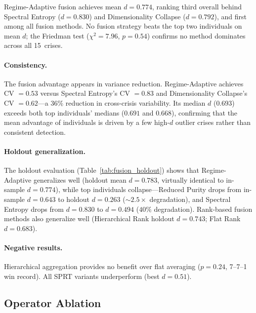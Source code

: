 \documentclass[3p]{elsarticle}
\begin{document}
Regime-Adaptive fusion achieves mean $d = 0.774$, ranking third
overall behind Spectral Entropy ($d = 0.830$) and Dimensionality
Collapse ($d = 0.792$), and first among all fusion methods.
No fusion strategy beats the top two individuals on mean $d$; the
Friedman test ($\chi^2 = 7.96$, $p = 0.54$) confirms no method
dominates across all 15~crises.

\paragraph{Consistency.}
The fusion advantage appears in variance reduction.
Regime-Adaptive achieves CV $= 0.53$ versus Spectral Entropy's
CV $= 0.83$ and Dimensionality Collapse's CV $= 0.62$---a 36\%
reduction in cross-crisis variability.  Its median $d$ ($0.693$)
exceeds both top individuals' medians ($0.691$ and $0.668$),
confirming that the mean advantage of individuals is driven by a
few high-$d$ outlier crises rather than consistent detection.

\paragraph{Holdout generalization.}
\begin{table}[htb]
\centering
\caption{Fusion holdout: 4~post-2020 crises unseen during fusion
  weight training.  Bold indicates best per column.}
\label{tab:fusion_holdout}
\small

\end{table}

The holdout evaluation (Table~\ref{tab:fusion_holdout}) shows that Regime-Adaptive generalizes well (holdout mean
$d = 0.783$, virtually identical to in-sample $d = 0.774$), while
top individuals collapse---Reduced Purity drops from in-sample
$d = 0.643$ to holdout $d = 0.263$ (${\sim}2.5\times$ degradation), and
Spectral Entropy drops from $d = 0.830$ to $d = 0.494$ ($40\%$
degradation).  Rank-based fusion methods also generalize well
(Hierarchical Rank holdout $d = 0.743$; Flat Rank $d = 0.683$).

\paragraph{Negative results.}
Hierarchical aggregation provides no benefit over flat averaging
($p = 0.24$, 7--7--1 win record).  All SPRT variants underperform
(best $d = 0.51$).

\subsection{Operator Ablation}\label{subsec:operator_ablation}
\end{document}
